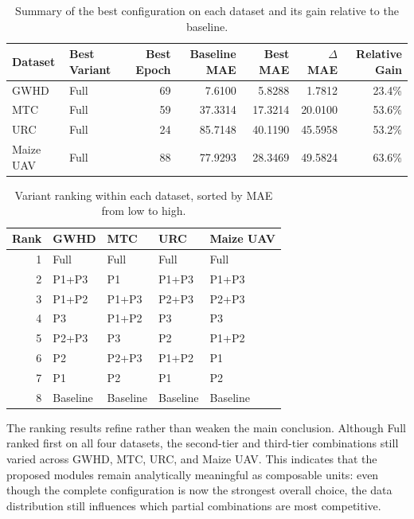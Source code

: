 \documentclass[a4paper,fleqn]{cas-sc}
\begin{document}
	\begin{table}[!htbp]
		\centering
		\caption{Summary of the best configuration on each dataset and its gain relative to the baseline.}
		\label{tab:best_variant_summary}
		\begin{tabular}{llrrrrr}
			\toprule
			Dataset & Best Variant & Best Epoch & Baseline MAE & Best MAE & $\Delta$MAE & Relative Gain \\
			\midrule
			GWHD      & Full & 69 & 7.6100  & 5.8288  & 1.7812  & 23.4\% \\
			MTC       & Full & 59 & 37.3314 & 17.3214 & 20.0100 & 53.6\% \\
			URC       & Full & 24 & 85.7148 & 40.1190 & 45.5958 & 53.2\% \\
			Maize UAV & Full & 88 & 77.9293 & 28.3469 & 49.5824 & 63.6\% \\
			\bottomrule
		\end{tabular}
	\end{table}
	
	\begin{table}[!htbp]
		\centering
		\caption{Variant ranking within each dataset, sorted by MAE from low to high.}
		\label{tab:variant_ranking}
		\begin{tabular}{rllll}
			\toprule
			Rank & GWHD & MTC & URC & Maize UAV \\
			\midrule
			1 & Full     & Full     & Full     & Full \\
			2 & P1+P3    & P1       & P1+P3    & P1+P3 \\
			3 & P1+P2    & P1+P3    & P2+P3    & P2+P3 \\
			4 & P3       & P1+P2    & P3       & P3 \\
			5 & P2+P3    & P3       & P2       & P1+P2 \\
			6 & P2       & P2+P3    & P1+P2    & P1 \\
			7 & P1       & P2       & P1       & P2 \\
			8 & Baseline & Baseline & Baseline & Baseline \\
			\bottomrule
		\end{tabular}
	\end{table}
	
	The ranking results refine rather than weaken the main conclusion. Although Full ranked first on all four datasets, the second-tier and third-tier combinations still varied across GWHD, MTC, URC, and Maize UAV. This indicates that the proposed modules remain analytically meaningful as composable units: even though the complete configuration is now the strongest overall choice, the data distribution still influences which partial combinations are most competitive.
	
\end{document}
